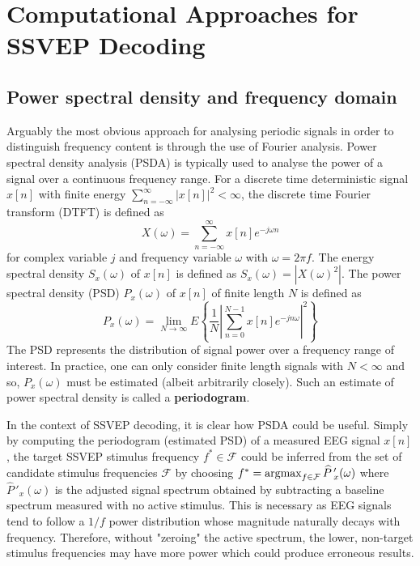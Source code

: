 \section{Computational Approaches for SSVEP Decoding}
\subsection{Power spectral density and frequency domain}
Arguably the most obvious approach for analysing periodic signals in order to distinguish frequency content is through the use of Fourier analysis. Power spectral density analysis (PSDA) is typically used to analyse the power of a signal over a continuous frequency range. For a discrete time deterministic signal ${x[n]}$ with finite energy $\sum_{n=-\infty}^\infty |x[n]|^2 < \infty$, the discrete time Fourier transform (DTFT) is defined as 
\begin{equation}
    X(\omega)=\sum_{n=-\infty}^{\infty} x[n] e^{-j \omega n}
\end{equation}
for complex variable $j$ and frequency variable $\omega$ with $\omega=2\pi f$. The energy spectral density $S_x(\omega)$ of $x[n]$ is defined as $S_x(\omega) = |X(\omega)^2|$. The power spectral density (PSD) $P_x(\omega)$ of $x[n]$ of finite length $N$ is defined as 
\begin{equation}
P_x(\omega)=\lim _{N \rightarrow \infty} E\left\{\frac{1}{N}\left|\sum_{n=0}^{N-1} x[n] e^{-jn \omega}\right|^{2}\right\}
\end{equation}
The PSD represents the distribution of signal power over a frequency range of interest. In practice, one can only consider finite length signals with $N < \infty$ and so, $P_x(\omega)$ must be estimated (albeit arbitrarily closely). Such an estimate of power spectral density is called a \textbf{periodogram}.

In the context of SSVEP decoding, it is clear how PSDA could be useful. Simply by computing the periodogram (estimated PSD) of a measured EEG signal $x[n]$, the target SSVEP stimulus frequency $f^* \in \mathcal{F}$ could be inferred from the set of candidate stimulus frequencies $\mathcal{F}$ by choosing $f^* = \operatorname*{argmax}_{f \in \mathcal{F}} \widehat{P}\,'_x(\omega)$ where $\widehat{P}\,'_x(\omega)$ is the adjusted signal spectrum obtained by subtracting a baseline spectrum measured with no active stimulus. This is necessary as EEG signals tend to follow a $1/f$ power distribution whose magnitude naturally decays with frequency. Therefore, without "zeroing" the active spectrum, the lower, non-target stimulus frequencies may have more power which could produce erroneous results. 
